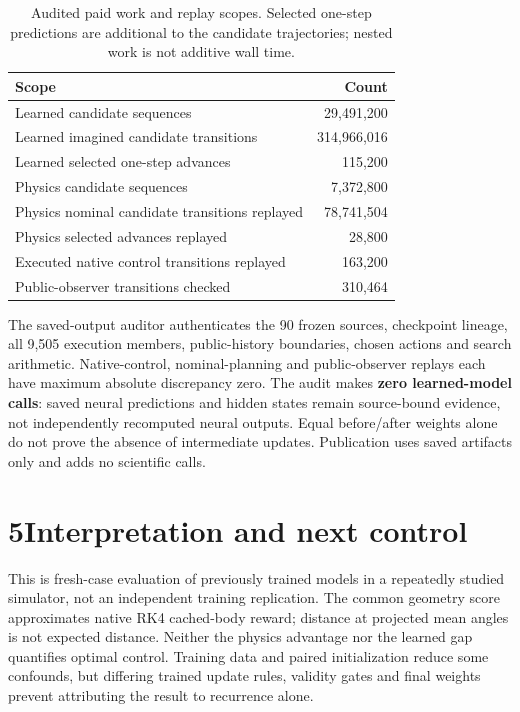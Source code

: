 \documentclass[10pt,letterpaper]{article}
\begin{document}
\begin{table}[h]
\centering\small
\caption{Audited paid work and replay scopes. Selected one-step predictions
are additional to the candidate trajectories; nested work is not additive wall time.}
\begin{tabular}{lr}
\toprule Scope & Count\\
\midrule
Learned candidate sequences & 29,491,200\\
Learned imagined candidate transitions & 314,966,016\\
Learned selected one-step advances & 115,200\\
Physics candidate sequences & 7,372,800\\
Physics nominal candidate transitions replayed & 78,741,504\\
Physics selected advances replayed & 28,800\\
Executed native control transitions replayed & 163,200\\
Public-observer transitions checked & 310,464\\
\bottomrule
\end{tabular}
\end{table}

The saved-output auditor authenticates the 90 frozen sources, checkpoint
lineage, all 9,505 execution members, public-history boundaries, chosen actions
and search arithmetic. Native-control, nominal-planning and public-observer
replays each have maximum absolute discrepancy zero. The audit makes
\textbf{zero learned-model calls}: saved neural predictions and hidden states
remain source-bound evidence, not independently recomputed neural outputs.
Equal before/after weights alone do not prove the absence of intermediate
updates. Publication uses saved artifacts only and adds no scientific calls.

\section*{5\quad Interpretation and next control}
This is fresh-case evaluation of previously trained models in a repeatedly
studied simulator, not an independent training replication. The common geometry
score approximates native RK4 cached-body reward; distance at projected mean
angles is not expected distance. Neither the physics advantage nor the learned
gap quantifies optimal control. Training data and paired initialization reduce
some confounds, but differing trained update rules, validity gates and final
weights prevent attributing the result to recurrence alone.
\end{document}
